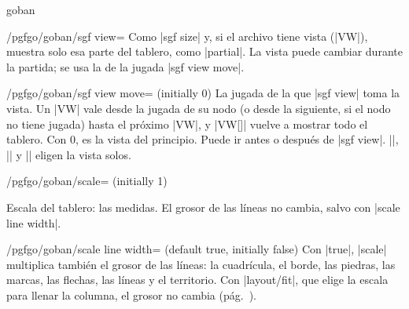\begin{environment}{{goban}}
	\begin{key}{/pgfgo/goban/sgf view=}
		Como |sgf size| y, si el archivo tiene vista (|VW|), muestra solo esa parte del tablero, como |partial|. La vista puede cambiar durante la partida; se usa la de la jugada |sgf view move|.
	\end{key}

	\begin{key}{/pgfgo/goban/sgf view move= (initially 0)}
		La jugada de la que |sgf view| toma la vista. Un |VW| vale desde la jugada de su nodo (o desde la siguiente, si el nodo no tiene jugada) hasta el próximo |VW|, y |VW[]| vuelve a mostrar todo el tablero. Con 0, es la vista del principio. Puede ir antes o después de |sgf view|. |\sgfdiagrams|, |\sgfanimation| y |\sgfproblem| eligen la vista solos.

		\begin{codeexample}
			\begin{goban}[sgf view = partida, sgf view move = 120]
			\end{goban}
		\end{codeexample}
	\end{key}

	\begin{key}{/pgfgo/goban/scale= (initially 1)}
		
		Escala del tablero: las medidas. El grosor de las líneas no cambia, salvo con |scale line width|.

		\begin{codeexample}[width=5.5cm]
			\begin{goban}[2, scale = 2]
			\end{goban}

			\begin{goban}[2, scale = 1]
			\end{goban}

			\begin{goban}[2, scale = 0.5]
			\end{goban}
		\end{codeexample}
	\end{key}

	\begin{key}{/pgfgo/goban/scale line width= (default true, initially false)}
		Con |true|, |scale| multiplica también el grosor de las líneas: la cuadrícula, el borde, las piedras, las marcas, las flechas, las líneas y el territorio. Con |layout/fit|, que elige la escala para llenar la columna, el grosor no cambia (pág.~\pageref{subsec:disposicion}).


\end{key}
\end{environment}
